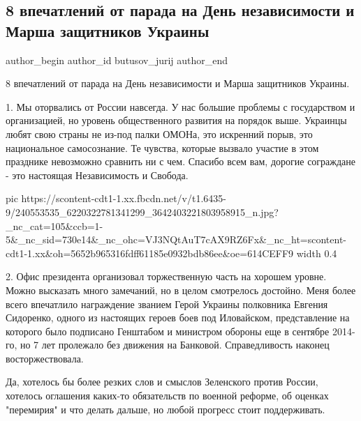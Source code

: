  
 
 
 
 
 
\subsection{8 впечатлений от парада на День независимости и Марша защитников Украины}
\label{sec:24_08_2021.fb.butusov_jurij.1.vpechatlenija_parad_kiev}
 
\ifcmt
 author_begin
   author_id butusov_jurij
 author_end
\fi

8 впечатлений от парада на День независимости и Марша защитников Украины.

1. Мы оторвались от России навсегда. У нас большие проблемы с государством и
организацией, но уровень общественного развития на порядок выше. Украинцы любят
свою страны не из-под палки ОМОНа, это искренний порыв, это национальное
самосознание. Те чувства, которые вызвало участие в этом празднике невозможно
сравнить ни с чем. Спасибо всем вам, дорогие сограждане - это настоящая
Независимость и Свобода.

\ifcmt
  pic https://scontent-cdt1-1.xx.fbcdn.net/v/t1.6435-9/240553535_6220322781341299_3642403221803958915_n.jpg?_nc_cat=105&ccb=1-5&_nc_sid=730e14&_nc_ohc=VJ3NQtAuT7cAX9RZ6Fx&_nc_ht=scontent-cdt1-1.xx&oh=5652b965316fdff61185e0932bdb86ee&oe=614CEFF9
  width 0.4
\fi

2. Офис президента организовал торжественную часть на хорошем уровне. Можно
высказать много замечаний, но в целом смотрелось достойно. Меня более всего
впечатлило награждение званием Герой Украины полковника Евгения Сидоренко,
одного из настоящих героев боев под Иловайском, представление на которого было
подписано Генштабом и министром обороны еще в сентябре 2014-го, но 7 лет
пролежало без движения на Банковой. Справедливость наконец восторжествовала. 

Да, хотелось бы более резких слов и смыслов Зеленского против России, хотелось
оглашения каких-то обязательств по военной реформе,  об оценках "перемирия" и
что делать дальше, но любой прогресс стоит поддерживать.


